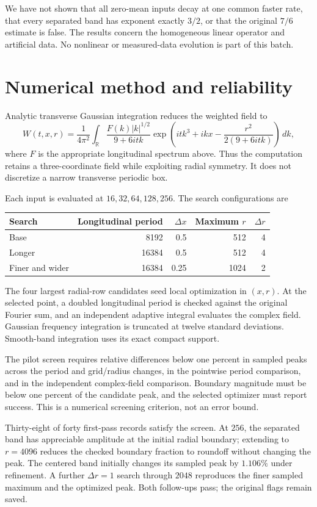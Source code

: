 \documentclass[10pt]{article}
\begin{document}
We have not shown that all zero-mean inputs decay at one common faster rate, that every separated band has exponent exactly $3/2$, or that the original $7/6$ estimate is false. The results concern the homogeneous linear operator and artificial data. No nonlinear or measured-data evolution is part of this batch.

\newpage
\section{Numerical method and reliability}
Analytic transverse Gaussian integration reduces the weighted field to
\[
 W(t,x,r)=\frac{1}{4\pi^2}\int_{\mathbb R}
 \frac{F(k)|k|^{1/2}}{9+6itk}
 \exp\!\left(itk^3+ikx-\frac{r^2}{2(9+6itk)}\right)\,dk,
\]
where $F$ is the appropriate longitudinal spectrum above. Thus the computation retains a three-coordinate field while exploiting radial symmetry. It does not discretize a narrow transverse periodic box.

Each input is evaluated at $16,32,64,128,256$. The search configurations are
\begin{center}\begin{tabular}{lrrrr}\toprule
Search & Longitudinal period & $\Delta x$ & Maximum $r$ & $\Delta r$\\\midrule
Base & 8192 & 0.5 & 512 & 4\\
Longer & 16384 & 0.5 & 512 & 4\\
Finer and wider & 16384 & 0.25 & 1024 & 2\\\bottomrule
\end{tabular}\end{center}
The four largest radial-row candidates seed local optimization in $(x,r)$. At the selected point, a doubled longitudinal period is checked against the original Fourier sum, and an independent adaptive integral evaluates the complex field. Gaussian frequency integration is truncated at twelve standard deviations. Smooth-band integration uses its exact compact support.

The pilot screen requires relative differences below one percent in sampled peaks across the period and grid/radius changes, in the pointwise period comparison, and in the independent complex-field comparison. Boundary magnitude must be below one percent of the candidate peak, and the selected optimizer must report success. This is a numerical screening criterion, not an error bound.

Thirty-eight of forty first-pass records satisfy the screen. At $256$, the separated band has appreciable amplitude at the initial radial boundary; extending to $r=4096$ reduces the checked boundary fraction to roundoff without changing the peak. The centered band initially changes its sampled peak by $1.106\%$ under refinement. A further $\Delta r=1$ search through $2048$ reproduces the finer sampled maximum and the optimized peak. Both follow-ups pass; the original flags remain saved.
\end{document}
